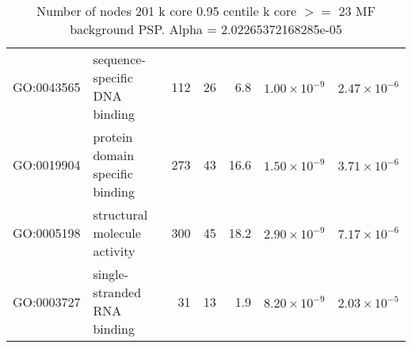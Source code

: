 \begin{table}[ht]
\begin{tabular}{llrrrrr}
  GO:0043565 & sequence-specific DNA binding & 112 & 26 & 6.8 & $1.00 \times 10^{-9}$ & $2.47 \times 10^{-6}$ \\ 
  GO:0019904 & protein domain specific binding & 273 & 43 & 16.6 & $1.50 \times 10^{-9}$ & $3.71 \times 10^{-6}$ \\ 
  GO:0005198 & structural molecule activity & 300 & 45 & 18.2 & $2.90 \times 10^{-9}$ & $7.17 \times 10^{-6}$ \\ 
  GO:0003727 & single-stranded RNA binding & 31 & 13 & 1.9 & $8.20 \times 10^{-9}$ & $2.03 \times 10^{-5}$ \\ 
   \hline
\end{tabular}
\caption{Number of nodes 201 k core 0.95 centile  k core $>=$ 23 MF background PSP. Alpha = 2.02265372168285e-05} 
\label{tab:Number of nodes 201 k core 0.95 centile  k core $>=$ 23 MF background PSP. Alpha = 2.02265372168285e-05}
\end{table}

